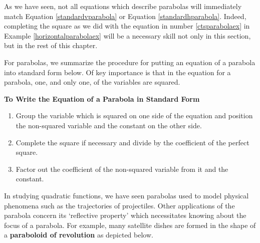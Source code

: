 \documentclass{ximera}
\begin{document}
\begin{example}
\begin{explanation}
\begin{enumerate}
\begin{enumerate}
\end{enumerate}

\end{enumerate}
\end{explanation}
\end{example}

As we have seen, not all equations which describe parabolas will immediately match Equation \ref{standardvparabola} or Equation \ref{standardhparabola}.  Indeed, completing the square as we did with the equation in number \ref{ctsparabolaex} in Example \ref{horizontalparabolaex}  will be a necessary skill not only in this section, but in the rest of this chapter. 

 

 For parabolas, we summarize the procedure for putting an equation of a parabola into standard form below.  Of key importance is that in the equation for a parabola, one, and only one, of the variables are squared.

 


\centerline{\textbf{To Write the Equation of a Parabola in Standard Form}}

\begin{enumerate}

\item  Group the variable which is squared on one side of the equation and position the non-squared variable and the constant on the other side.

\item  Complete the square if necessary and divide by the coefficient of the perfect square.

\item  Factor out the coefficient of the non-squared variable from it and the constant.

\end{enumerate}



\label{paraboloid}
In studying quadratic functions, we have seen parabolas used to model physical phenomena such as the trajectories of projectiles.  Other applications of the parabola concern its `reflective property' which necessitates knowing about the focus of a parabola.  For example, many satellite dishes are formed in the shape of a  \textbf{paraboloid of revolution} as depicted below.

\end{document}
